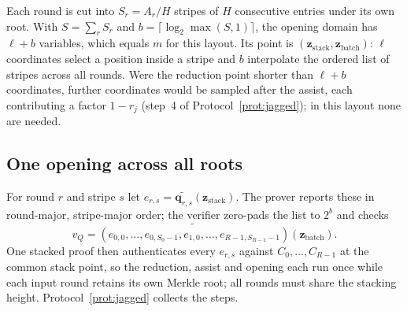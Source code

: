 Each round is cut into $S_r=A_r/H$ stripes of $H$ consecutive entries under its own root. With $S=\sum_r S_r$ and $b=\lceil\log_2\max(S,1)\rceil$, the opening domain has $\ell+b$ variables, which equals $m$ for this layout. Its point is $(\bm z_{\mathrm{stack}},\bm z_{\mathrm{batch}})$: $\ell$ coordinates select a position inside a stripe and $b$ interpolate the ordered list of stripes across all rounds. Were the reduction point shorter than $\ell+b$ coordinates, further coordinates would be sampled after the assist, each contributing a factor $1-r_j$ (step~4 of Protocol~\ref{prot:jagged}); in this layout none are needed.

\subsection{One opening across all roots}
\label{sec:pcs-multiround-open}

For round $r$ and stripe $s$ let $e_{r,s}=\widetilde{\mathbf q_{r,s}}(\bm z_{\mathrm{stack}})$. The prover reports these in round-major, stripe-major order; the verifier zero-pads the list to $2^b$ and checks
\begin{equation}
\label{eq:stacking-bind}
  v_Q
  =\widetilde{(e_{0,0},\ldots,e_{0,S_0-1},e_{1,0},\ldots,e_{R-1,S_{R-1}-1})}
     (\bm z_{\mathrm{batch}}).
\end{equation}
One stacked \WHIR{} proof then authenticates every $e_{r,s}$ against $C_0,\ldots,C_{R-1}$ at the common stack point, so the reduction, assist and opening each run once while each input round retains its own Merkle root; all rounds must share the stacking height. Protocol~\ref{prot:jagged} collects the steps.

